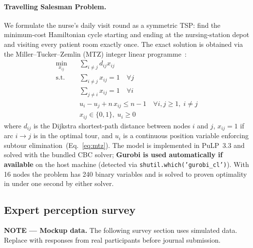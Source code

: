 \documentclass[12pt,a4paper]{article}
\begin{document}
\paragraph{Travelling Salesman Problem.}
We formulate the nurse's daily visit round as a symmetric TSP:
find the minimum-cost Hamiltonian cycle starting and ending at the
nursing-station depot and visiting every patient room exactly once.
The exact solution is obtained via the Miller--Tucker--Zemlin (MTZ)
integer linear programme~\cite{miller1960integer}:
\begin{align}
  \min_{x_{ij}} &\quad \sum_{i \neq j} d_{ij} x_{ij} \label{eq:tsp_obj}\\
  \text{s.t.} &\quad \sum_{i \neq j} x_{ij} = 1 \quad \forall j \label{eq:tsp_in}\\
              &\quad \sum_{j \neq i} x_{ij} = 1 \quad \forall i \label{eq:tsp_out}\\
              &\quad u_i - u_j + n \, x_{ij} \leq n-1 \quad \forall i,j \geq 1,\; i \neq j \label{eq:mtz}\\
              &\quad x_{ij} \in \{0,1\},\; u_i \geq 0 \label{eq:domain}
\end{align}
where $d_{ij}$ is the Dijkstra shortest-path distance between nodes $i$ and $j$,
$x_{ij}=1$ if arc $i \to j$ is in the optimal tour, and $u_i$ is a continuous
position variable enforcing subtour elimination~(Eq.~\ref{eq:mtz}).
The model is implemented in PuLP~3.3 and solved with the bundled CBC solver;
\textbf{Gurobi is used automatically if available} on the host machine
(detected via \texttt{shutil.which('gurobi\_cl')}).
With 16 nodes the problem has 240 binary variables and is solved to proven optimality
in under one second by either solver.

\subsection{Expert perception survey}
\label{sec:methods_survey}

\begin{mockupbox}
\textbf{NOTE --- Mockup data.}
The following survey section uses simulated data.
Replace with responses from real participants before journal submission.
\end{mockupbox}
\end{document}
